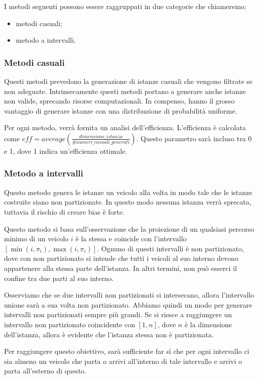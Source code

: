 \documentclass[../../main.tex]{subfiles}
\begin{document}
I metodi seguenti possono essere raggruppati in due categorie che chiameremo:
\begin{itemize}
    \item metodi casuali;
    \item metodo a intervalli.
\end{itemize}

\subsubsection{Metodi casuali}
Questi metodi prevedono la generazione di istanze casuali che vengono filtrate se non adeguate.
Intrinsecamente questi metodi portano a generare anche istanze non valide, sprecando risorse computazionali.
In compenso, hanno il grosso vantaggio di generare istanze con una distribuzione di probabilità uniforme.

Per ogni metodo, verrà fornita un analisi dell'efficienza.
L'efficienza è calcolata come $eff = average\left(\frac{dimensione\_istanza}{\#numeri\_casuali\_generati}\right)$.
Questo parametro sarà incluso tra 0 e 1, dove 1 indica un'efficienza ottimale.

\subsubsection{Metodo a intervalli}
Questo metodo genera le istanze un veicolo alla volta in modo tale che le istanze costruite siano non partizionate.
In questo modo nessuna istanza verrà sprecata, tuttavia il rischio di creare bias è forte.

Questo metodo si basa sull'osservazione che la proiezione di un qualsiasi percorso minimo di un veicolo $i$ è la stessa e coincide con l'intervallo $[\min(i, \pi_i), \max(i, \pi_i)]$.
Ognuno di questi intervalli è non partizionato, dove con non partizionato si intende che tutti i veicoli al suo interno devono appartenere alla stessa parte dell'istanza.
In altri termini, non può esserci il confine tra due parti al suo interno.

Osserviamo che se due intervalli non partizionati si intersecano, allora l'intervallo unione sarà a sua volta non partizionato.
Abbiamo quindi un modo per generare intervalli non partizionati sempre più grandi.
Se si riesce a raggiungere un intervallo non partizionato coincidente con $[1, n]$, dove $n$ è la dimensione dell'istanza, allora è evidente che l'istanza stessa non è partizionata.

Per raggiungere questo obiettivo, sarà sufficiente far sì che per ogni intervallo ci sia almeno un veicolo che parta o arrivi all'interno di tale intervallo e arrivi o parta all'esterno di questo.
\end{document}
